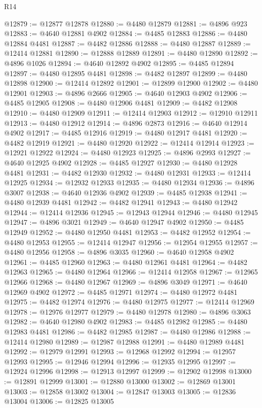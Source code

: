 \begin{lexlean}{R14}
\begin{coremodule}
@12879 := @12877 @12878
@12880 := @4480 @12879
@12881 := @4896 @923
@12883 := @4640 @12881 @4902
@12884 := @4485 @12883
@12886 := @4480 @12884 @4481
@12887 := @4482 @12886
@12888 := @4480 @12887
@12889 := @12414 @12881
@12890 := @12888 @12889
@12891 := @4480 @12890
@12892 := @4896 @1026
@12894 := @4640 @12892 @4902
@12895 := @4485 @12894
@12897 := @4480 @12895 @4481
@12898 := @4482 @12897
@12899 := @4480 @12898
@12900 := @12414 @12892
@12901 := @12899 @12900
@12902 := @4480 @12901
@12903 := @4896 @2666
@12905 := @4640 @12903 @4902
@12906 := @4485 @12905
@12908 := @4480 @12906 @4481
@12909 := @4482 @12908
@12910 := @4480 @12909
@12911 := @12414 @12903
@12912 := @12910 @12911
@12913 := @4480 @12912
@12914 := @4896 @2873
@12916 := @4640 @12914 @4902
@12917 := @4485 @12916
@12919 := @4480 @12917 @4481
@12920 := @4482 @12919
@12921 := @4480 @12920
@12922 := @12414 @12914
@12923 := @12921 @12922
@12924 := @4480 @12923
@12925 := @4896 @2993
@12927 := @4640 @12925 @4902
@12928 := @4485 @12927
@12930 := @4480 @12928 @4481
@12931 := @4482 @12930
@12932 := @4480 @12931
@12933 := @12414 @12925
@12934 := @12932 @12933
@12935 := @4480 @12934
@12936 := @4896 @3007
@12938 := @4640 @12936 @4902
@12939 := @4485 @12938
@12941 := @4480 @12939 @4481
@12942 := @4482 @12941
@12943 := @4480 @12942
@12944 := @12414 @12936
@12945 := @12943 @12944
@12946 := @4480 @12945
@12947 := @4896 @3021
@12949 := @4640 @12947 @4902
@12950 := @4485 @12949
@12952 := @4480 @12950 @4481
@12953 := @4482 @12952
@12954 := @4480 @12953
@12955 := @12414 @12947
@12956 := @12954 @12955
@12957 := @4480 @12956
@12958 := @4896 @3035
@12960 := @4640 @12958 @4902
@12961 := @4485 @12960
@12963 := @4480 @12961 @4481
@12964 := @4482 @12963
@12965 := @4480 @12964
@12966 := @12414 @12958
@12967 := @12965 @12966
@12968 := @4480 @12967
@12969 := @4896 @3049
@12971 := @4640 @12969 @4902
@12972 := @4485 @12971
@12974 := @4480 @12972 @4481
@12975 := @4482 @12974
@12976 := @4480 @12975
@12977 := @12414 @12969
@12978 := @12976 @12977
@12979 := @4480 @12978
@12980 := @4896 @3063
@12982 := @4640 @12980 @4902
@12983 := @4485 @12982
@12985 := @4480 @12983 @4481
@12986 := @4482 @12985
@12987 := @4480 @12986
@12988 := @12414 @12980
@12989 := @12987 @12988
@12991 := @4480 @12989 @4481
@12992 := @12979 @12991
@12993 := @12968 @12992
@12994 := @12957 @12993
@12995 := @12946 @12994
@12996 := @12935 @12995
@12997 := @12924 @12996
@12998 := @12913 @12997
@12999 := @12902 @12998
@13000 := @12891 @12999
@13001 := @12880 @13000
@13002 := @12869 @13001
@13003 := @12858 @13002
@13004 := @12847 @13003
@13005 := @12836 @13004
@13006 := @12825 @13005

\end{coremodule}
\end{lexlean}
